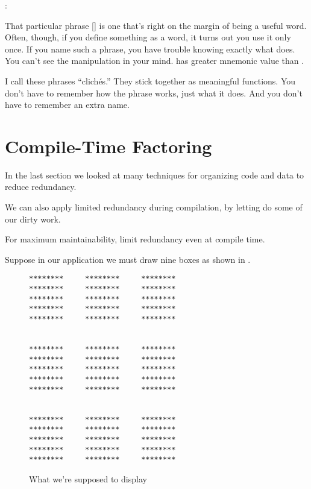 \begin{interview}
:

\begin{tfquot}
That particular phrase [\forthb{ +}] is one
that's right on the margin of being a useful word. Often, though, if
you define something as a word, it turns out you use it only once. If
you name such a phrase, you have trouble knowing exactly what
 does. You can't see the manipulation in your
mind. \forthb{+ } has greater mnemonic
value than .
\end{tfquot}
\end{interview}
I call these phrases ``clich\'es.'' They stick together as meaningful
functions. You don't have to remember how the phrase works, just what
it does. And you don't have to remember an extra name.

\section{Compile-Time Factoring}

\noindent
In the last section we looked at many techniques for organizing code
and data to reduce redundancy.

We can also apply limited redundancy during compilation, by letting
\Forth{} do some of our dirty work.

\begin{tip}
For maximum maintainability, limit redundancy even at compile time.
\end{tip}
Suppose in our application we must draw nine boxes as shown in
.

\begin{figure*}[hhhh]
\caption{What we're supposed to display}
\begin{center}
\begin{BVerbatim}[baselinestretch=0.7]
********     ********     ********
********     ********     ********
********     ********     ********
********     ********     ********
********     ********     ********


********     ********     ********
********     ********     ********
********     ********     ********
********     ********     ********
********     ********     ********


********     ********     ********
********     ********     ********
********     ********     ********
********     ********     ********
********     ********     ********
\end{BVerbatim}
\end{center}
\end{figure*}

